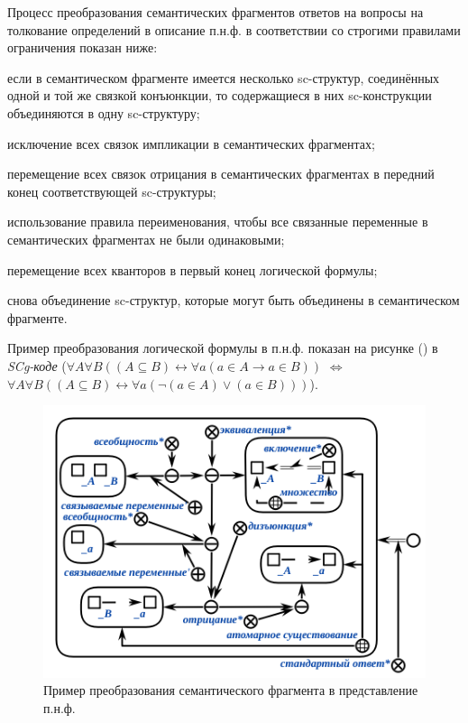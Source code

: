 Процесс преобразования семантических фрагментов ответов на вопросы на толкование определений в описание п.н.ф. в соответствии со строгими правилами ограничения показан ниже:

\begin{textitemize}
	\item если в семантическом фрагменте имеется несколько sc-структур, соединённых одной и той же связкой конъюнкции, то содержащиеся в них sc-конструкции объединяются в одну sc-структуру;
	
	\item исключение всех связок импликации в семантических фрагментах;
	
	\item перемещение всех связок отрицания в семантических фрагментах в передний конец соответствующей sc-структуры;
	
	\item использование правила переименования, чтобы все связанные переменные в семантических фрагментах не были одинаковыми;
	
	\item перемещение всех кванторов в первый конец логической формулы;
	
	\item снова объединение sc-структур, которые могут быть объединены в семантическом фрагменте.
	
\end{textitemize}

Пример преобразования логической формулы в п.н.ф. показан на рисунке (\textit{}) в \textit{SCg-коде} ($\forall A\forall B((A\subseteq B) \leftrightarrow \forall a(a\in A\rightarrow a\in B))$ $\Leftrightarrow$ $\forall A\forall B((A\subseteq B) \leftrightarrow \forall a ( \neg ( a\in A ) \lor (a\in B)))$).

\begin{figure}[H]
	\includegraphics[scale=0.8]{author/part7/figures/PNF_example.png}
	\caption{Пример преобразования семантического фрагмента в представление п.н.ф.}
	\label{fig:PNF_example}
\end{figure}


